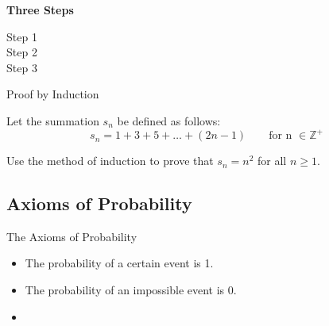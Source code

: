 \documentclass[]{report}
\begin{document}
\textbf{Three Steps}
\begin{description}
\item[Step 1]
\item[Step 2]
\item[Step 3]
\end{description}


{Proof by Induction}

Let the summation $s_n$ be defined as follows:
\[s_n = 1 + 3 + 5 + \ldots + (2n - 1) \qquad \mbox{for n }\in \mathbb{Z}^{+}\]

Use the method of induction to prove that $s_n = n^2$ for all $n \geq 1$.




\subsection{Axioms of Probability}

The Axioms of Probability

\begin{itemize}
\item The probability of a certain event is 1.
\item The probability of an impossible event is 0.
\item 
\end{itemize}
\end{document}
